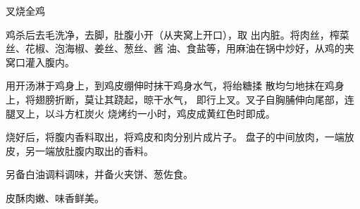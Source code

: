 \begin{recipe}{叉烧全鸡}

\ingredients




\cooking

鸡杀后去毛洗净，去脚，肚腹小开（从夹窝上开口），取 出内脏。将肉丝，榨菜丝、花椒、泡海椒、姜丝、葱丝、酱 油、食盐等，用麻油在锅中炒好，从鸡的夹窝口灌入腹内。

用开汤淋于鸡身上，到鸡皮绷伸时抹干鸡身水气，将绐糖揉 散均匀地抹在鸡身上，将翅膀折断，莫让其跷起，晾干水气， 即行上叉。叉子自胸脯伸向尾部，连腿叉上，以斗方杠炭火 烧烤约一小时，鸡皮成黄红色时即成。

烧好后，将腹内香料取出，将鸡皮和肉分别片成片子。 盘子的中间放肉，一端放皮，另一端放肚腹内取出的香料。

另备白油调料调味，并备火夹饼、葱佐食。

\notes

皮酥肉嫩、味香鲜美。

\end{recipe}

